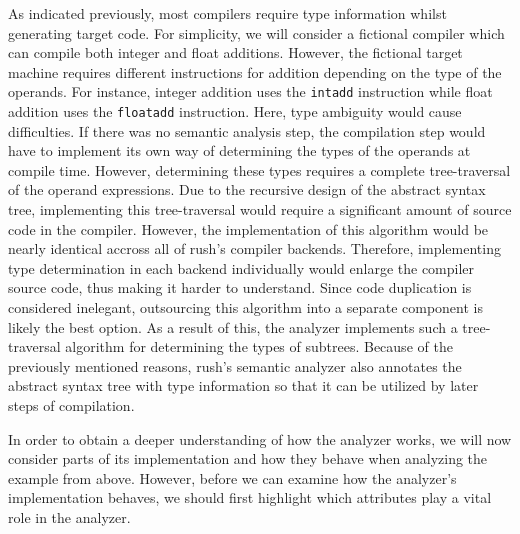 As indicated previously, most compilers require type information whilst
generating target code. For simplicity, we will consider a fictional compiler
which can compile both integer and float additions. However, the fictional
target machine requires different instructions for addition depending on the
type of the operands. For instance, integer addition uses the \texttt{intadd} instruction
while float addition uses the \texttt{floatadd} instruction. Here, type ambiguity would
cause difficulties. If there was no semantic analysis step, the compilation step would
have to implement its own way of determining the types of the operands at
compile time. However, determining these types requires a complete
tree-traversal of the operand expressions. Due to the recursive design of the
abstract syntax tree, implementing this tree-traversal would require a
significant amount of source code in the compiler. However, the implementation
of this algorithm would be nearly identical accross all of rush's compiler
backends. Therefore, implementing type determination in each backend
individually would enlarge the compiler source code, thus making it harder to
understand. Since code duplication is considered inelegant, outsourcing this
algorithm into a separate component is likely the best option. As a result of
this, the analyzer implements such a tree-traversal algorithm for
determining the types of subtrees. Because of the previously mentioned reasons,
rush's semantic analyzer also annotates the abstract syntax tree with type
information so that it can be utilized by later steps of compilation.

In order to obtain a deeper understanding of how the analyzer works, we will now
consider parts of its implementation and how they behave when analyzing the
example from above. However, before we can examine how the analyzer's implementation behaves,
we should first highlight which attributes play a vital role in the analyzer.


